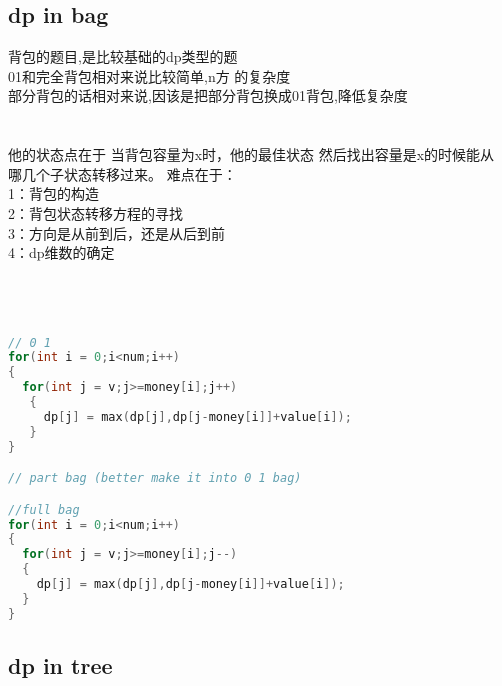 \documentclass[a4paper,11pt]{article}
\begin{document}
\subsection{dp in bag}
\begin{CJK}{UTF8}{gkai}
背包的题目,是比较基础的dp类型的题\\
01和完全背包相对来说比较简单,n方 的复杂度\\
部分背包的话相对来说,因该是把部分背包换成01背包,降低复杂度\\
\\\\
他的状态点在于
当背包容量为x时，他的最佳状态
然后找出容量是x的时候能从
哪几个子状态转移过来。
难点在于：\\
1：背包的构造\\
2：背包状态转移方程的寻找\\
3：方向是从前到后，还是从后到前\\
4：dp维数的确定\\\\\\\\
\end{CJK}

\begin{lstlisting}[language = C]
// 0 1
for(int i = 0;i<num;i++)
{
  for(int j = v;j>=money[i];j++)
   {
     dp[j] = max(dp[j],dp[j-money[i]]+value[i]);
   }
}

// part bag (better make it into 0 1 bag)

//full bag
for(int i = 0;i<num;i++)
{
  for(int j = v;j>=money[i];j--)
  {
    dp[j] = max(dp[j],dp[j-money[i]]+value[i]);
  }
}
\end{lstlisting}
\subsection{dp in tree}
\end{document}
